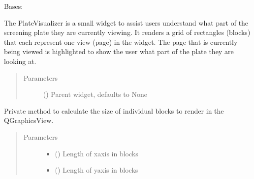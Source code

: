 \documentclass[letterpaper,10pt,english]{sphinxmanual}
\begin{document}
\begin{fulllineitems}
\label{\detokenize{polo.widgets:polo.widgets.plate_visualizer.PlateVisualizer}}
Bases: 

The PlateVisualizer is a small widget to assist users understand
what part of the screening plate they are currently viewing. It renders
a grid of rectangles (blocks) that each represent one view (page) in the
 widget. The page that is currently being viewed is 
highlighted to show the user what part of the plate they are looking at.
\begin{quote}\begin{description}
\item[{Parameters}] \leavevmode
{} (\sphinxstyleliteralemphasis{\sphinxupquote{, }}) \textendash{} Parent widget, defaults to None

\end{description}\end{quote}

\begin{fulllineitems}
\label{\detokenize{polo.widgets:polo.widgets.plate_visualizer.PlateVisualizer._block_size}}
Private method to calculate the size of individual blocks
to render in the QGraphicsView.
\begin{quote}\begin{description}
\item[{Parameters}] \leavevmode\begin{itemize}
\item {} 
 () \textendash{} Length of x\sphinxhyphen{}axis in blocks

\item {} 
 () \textendash{} Length of y\sphinxhyphen{}axis in blocks


\end{itemize}
\end{description}
\end{quote}
\end{fulllineitems}
\end{fulllineitems}
\end{document}
